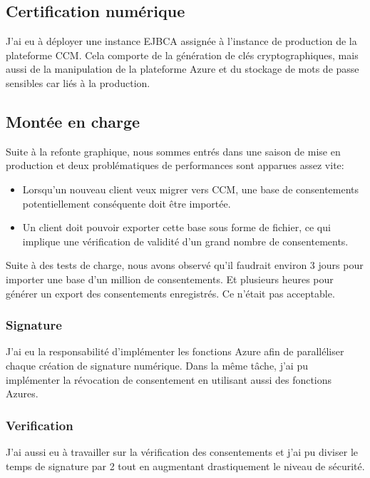 \documentclass[12pt, a4paper]{report}
\newcommand\tab[1][1cm]{\hspace*{#1}}
\begin{document}
            \subsection{Certification numérique}
                J'ai eu à déployer une instance EJBCA assignée à l'instance de production de la plateforme CCM.\newline
                Cela comporte de la génération de clés cryptographiques, mais aussi de la manipulation de la plateforme Azure et du stockage de mots de passe sensibles car liés à la production.
            \subsection{Montée en charge}
                \tab{} Suite à la refonte graphique, nous sommes entrés dans une saison de mise en production et deux problématiques de performances sont apparues assez vite:
                \begin{itemize}
                \item Lorsqu'un nouveau client veux migrer vers CCM, une base de consentements potentiellement conséquente doit être importée.
                \item Un client doit pouvoir exporter cette base sous forme de fichier, ce qui implique une vérification de validité d'un grand nombre de consentements.
                \end{itemize}

                Suite à des tests de charge, nous avons observé qu'il faudrait environ 3 jours pour importer une base d'un million de consentements. Et plusieurs heures pour générer un export des consentements enregistrés. Ce n'était pas acceptable.
                \subsubsection{Signature}
                J'ai eu la responsabilité d'implémenter les fonctions Azure afin de paralléliser chaque création de signature numérique.\newline
                Dans la même tâche, j'ai pu implémenter la révocation de consentement en utilisant aussi des fonctions Azures.
                \subsubsection{Verification}
                J'ai aussi eu à travailler sur la vérification des consentements et j'ai pu diviser le temps de signature par 2 tout en augmentant drastiquement le niveau de sécurité.
\end{document}
